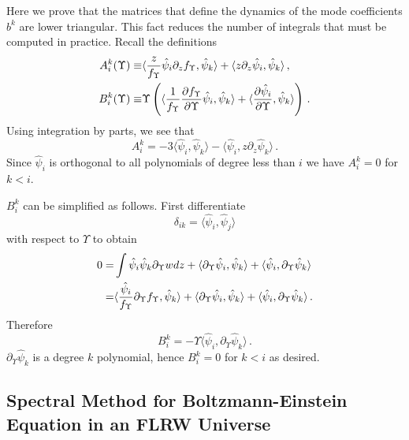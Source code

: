 Here we prove that the matrices that define the dynamics of the mode coefficients $b^k$ are lower triangular. This fact reduces the number of integrals that must be computed in practice.  Recall the definitions
\begin{align}\label{eq:lowerTri1}
A^k_i(\Upsilon)\equiv&\langle\frac{z}{f_\Upsilon }\hat\psi_i\partial_zf_\Upsilon ,\hat\psi_k\rangle+\langle z\partial_z \hat\psi_i,\hat\psi_k\rangle\,,\\
B^k_i(\Upsilon)\equiv &\Upsilon\left(\langle\frac{1}{f_\Upsilon }\frac{\partial f_\Upsilon }{\partial\Upsilon}\hat\psi_i,\hat\psi_k\rangle+\langle\frac{\partial\hat{\psi}_i}{\partial \Upsilon},\hat\psi_k\rangle\right)\,.\notag
\end{align}
Using integration by parts, we see that
\begin{equation}\label{eq:lowerTri2}
A^k_i=-3\langle\hat\psi_i,\hat\psi_k\rangle-\langle \hat \psi_i,z\partial_z\hat\psi_k\rangle\,.
\end{equation}
Since $\hat\psi_i$ is orthogonal to all polynomials of degree less than $i$ we have $A^k_i=0$ for  $k<i$.  

$B^k_i$ can be simplified as follows.  First differentiate 
\begin{equation}
\delta_{ik}=\langle \hat\psi_i,\hat\psi_j\rangle
\end{equation}
with respect to $\Upsilon$ to obtain
\begin{align}
0=&\int \hat\psi_i\hat\psi_k\partial_{\Upsilon}wdz+\langle \partial_{\Upsilon}\hat\psi_i,\hat\psi_k\rangle+\langle \hat\psi_i,\partial_{\Upsilon}\hat\psi_k\rangle\\
=&\langle\frac{\hat\psi_i}{f_\Upsilon}\partial_{\Upsilon}f_\Upsilon,\hat\psi_k \rangle+\langle\partial_{\Upsilon}\hat\psi_i,\hat\psi_k\rangle+\langle \hat\psi_i,\partial_{\Upsilon}\hat\psi_k\rangle\,.\notag
\end{align}
Therefore 
\begin{equation}\label{eq:lowerTri5}
B^k_i=-\Upsilon\langle\hat\psi_i,\partial_{\Upsilon}\hat\psi_k\rangle\,.
\end{equation}
$\partial_\Upsilon \hat\psi_k$ is a degree $k$ polynomial, hence $B_i^k=0$ for $k<i$ as desired.



\subsection{Spectral Method for Boltzmann-Einstein Equation  in an FLRW Universe}\label{sec:theMethod}


